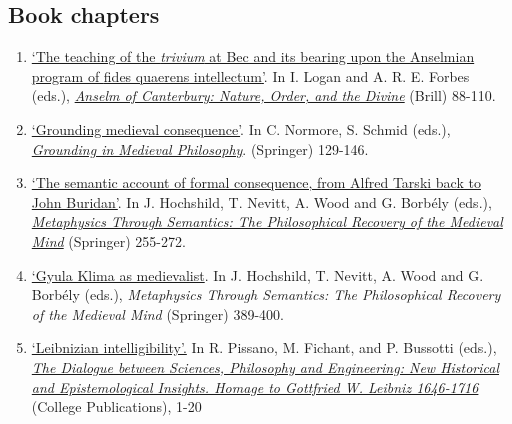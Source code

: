 \subsection{Book chapters}
\begin{enumerate}
	\setcounter{enumi}{\value{publicationCounter}}	%
	\item {}
{}
{
	\href{https://www.academia.edu/15012500/The_trivium_at_Bec_and_its_bearing_on_Anselms_programme_of_fides_quaerens_intellectum}{`The teaching of the \emph{trivium} at Bec and its bearing upon the Anselmian program of {fides quaerens intellectum}'}. In I. Logan and A. R. E. Forbes (eds.), \href{https://doi.org/10.1163/9789004716308_006}{\emph{Anselm of Canterbury: Nature, Order, and the Divine}} (Brill) 88-110.}
{}
	\item \datedsubsectionnarrow{}
{}
{
	\href{https://link.springer.com/chapter/10.1007/978-3-031-53666-3_6}{`Grounding medieval consequence'}. In C. Normore, S. Schmid (eds.), \href{https://link.springer.com/book/10.1007/978-3-031-53666-3}{\emph{Grounding in Medieval Philosophy}}. (Springer) 129-146.}
{}
\item {}
{}
{
	\href{https://www.academia.edu/29440650/The_semantic_account_of_formal_consequence_from_Alfred_Tarski_back_to_John_Buridan}{`The semantic account of formal consequence, from Alfred Tarski back to John Buridan'}. In J. Hochshild, T. Nevitt, A. Wood and G. Borb\'{e}ly (eds.), \href{https://link.springer.com/chapter/10.1007/978-3-031-15026-5_15}{\emph{Metaphysics Through Semantics: The Philosophical Recovery of the Medieval Mind}} (Springer) 255-272.}
{}
\item \datedsubsectionnarrow{}
{}
{
	\href{https://link.springer.com/content/pdf/bbm:978-3-031-15026-5/1}{`Gyula Klima as medievalist}. In J. Hochshild, T. Nevitt, A. Wood and G. Borb\'{e}ly (eds.), \emph{Metaphysics Through Semantics: The Philosophical Recovery of the Medieval Mind} (Springer) 389-400.}
{}
\item {}
{}
{
	\href{https://www.academia.edu/14265939/Leibnizian_intelligibility}{`Leibnizian intelligibility'.} In R. Pissano, M. Fichant, and P. Bussotti (eds.), \href{http://collegepublications.co.uk/dialogues/?00005}{\emph{The Dialogue between Sciences, Philosophy and Engineering: New Historical and Epistemological Insights. Homage to Gottfried W. Leibniz 1646-1716}} (College Publications), 1-20}
{}
	\setcounter{publicationCounter}{\value{enumi}}	%
\end{enumerate}

